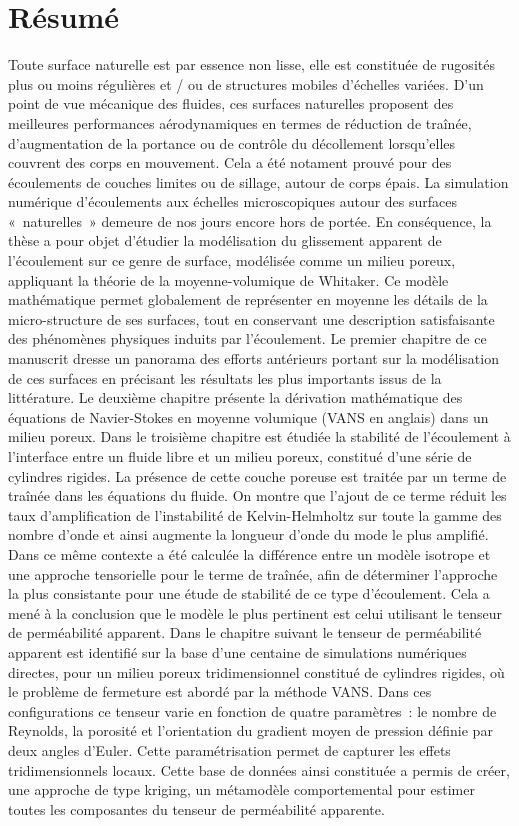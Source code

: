 \chapter*{Résumé}

Toute surface naturelle est par essence non lisse, elle est constituée de rugosités plus ou moins régulières et / ou de structures mobiles d’échelles variées. D’un point de vue mécanique des fluides, ces surfaces naturelles proposent des meilleures performances aérodynamiques en termes de réduction de traînée, d’augmentation de la portance ou de contrôle du décollement lorsqu’elles couvrent des corps en mouvement. Cela a été notament prouvé pour des écoulements de couches limites ou de sillage, autour de corps épais. La simulation numérique d’écoulements aux échelles microscopiques autour des surfaces « naturelles » demeure de nos jours encore hors de portée. En conséquence, la thèse a pour objet d’étudier la modélisation du glissement apparent de l’écoulement sur ce genre de surface, modélisée comme un milieu poreux, appliquant la théorie de la moyenne-volumique de Whitaker. Ce modèle mathématique permet globalement de représenter en moyenne les détails de la micro-structure de ses surfaces, tout en conservant une description satisfaisante des phénomènes physiques induits par l’écoulement. 
Le premier chapitre de ce manuscrit dresse un panorama des efforts antérieurs portant sur la modélisation de ces surfaces en précisant les résultats les plus importants issus de la littérature. Le deuxième chapitre présente la dérivation mathématique des équations de Navier-Stokes en moyenne volumique (VANS en anglais) dans un milieu poreux. Dans le troisième chapitre est étudiée la stabilité de l’écoulement à l’interface entre un fluide libre et un milieu poreux, constitué d'une série de cylindres rigides. La présence de cette couche poreuse est traitée par un terme de traînée dans les équations du fluide. On montre que l'ajout de ce terme réduit les taux d’amplification de l’instabilité de Kelvin-Helmholtz sur toute la gamme des nombre d’onde et ainsi augmente la longueur d’onde du mode le plus amplifié. Dans ce même contexte a été calculée la différence entre un modèle isotrope et une approche tensorielle pour le terme de traînée, afin de déterminer l’approche la plus consistante pour une étude de stabilité de ce type d’écoulement. Cela a mené à la conclusion que le modèle le plus pertinent est celui utilisant le tenseur de perméabilité apparent. Dans le chapitre suivant le tenseur de perméabilité apparent est identifié sur la base d’une centaine de simulations numériques directes, pour un milieu poreux tridimensionnel constitué de cylindres rigides, où le problème de fermeture est abordé par la méthode VANS. Dans ces configurations ce tenseur varie en fonction de quatre paramètres : le nombre de Reynolds, la porosité et l’orientation du gradient moyen de pression définie par deux angles d’Euler. Cette paramétrisation permet de capturer les effets tridimensionnels locaux. Cette base de données ainsi constituée a permis de créer, une approche de type kriging, un métamodèle comportemental pour estimer toutes les composantes du tenseur de perméabilité apparente.


